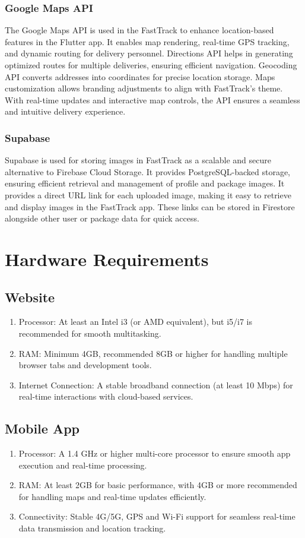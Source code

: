 \subsubsection{Google Maps API}
The Google Maps API is used in the FastTrack to enhance location-based features in the Flutter app. It enables map rendering, real-time GPS tracking, and dynamic routing for delivery personnel. Directions API helps in generating optimized routes for multiple deliveries, ensuring efficient navigation. Geocoding API converts addresses into coordinates for precise location storage. Maps customization allows branding adjustments to align with FastTrack’s theme. With real-time updates and interactive map controls, the API ensures a seamless and intuitive delivery experience.
\subsubsection{Supabase}
Supabase is used for storing images in FastTrack as a scalable and secure alternative to Firebase Cloud Storage. It provides PostgreSQL-backed storage, ensuring efficient retrieval and management of profile and package images. It provides a direct URL link for each uploaded image, making it easy to retrieve and display images in the FastTrack app. These links can be stored in Firestore alongside other user or package data for quick access. 
\section{Hardware Requirements}
\subsection{Website}
\begin{enumerate}
    \item Processor: At least an Intel i3 (or AMD equivalent), but i5/i7 is recommended for smooth multitasking.
    \item RAM: Minimum 4GB, recommended 8GB or higher for handling multiple browser tabs and development tools.
    \item Internet Connection: A stable broadband connection (at least 10 Mbps) for real-time interactions with cloud-based services.
\end{enumerate}
\subsection{Mobile App}
\begin{enumerate}
    \item Processor: A 1.4 GHz or higher multi-core processor to ensure smooth app execution and real-time processing.
    \item RAM: At least 2GB for basic performance, with 4GB or more recommended for handling maps and real-time updates efficiently.
    \item Connectivity: Stable 4G/5G, GPS and Wi-Fi support for seamless real-time data transmission and location tracking.
\end{enumerate}
